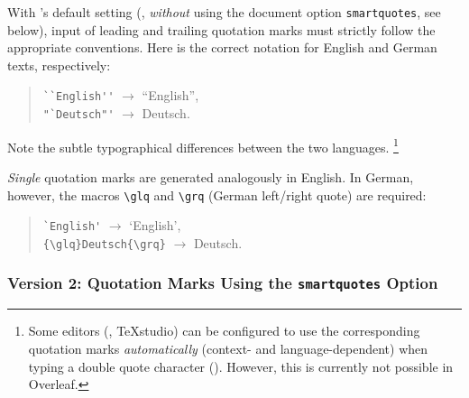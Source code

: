 With \latex's default setting (\ie, \emph{without} using the document option
\texttt{smartquotes}, see below), input of leading and trailing
quotation marks must strictly follow the appropriate conventions. Here is the
correct \latex notation for English and German texts, respectively:
%
\begin{quote}
    \verb!``English''! $\rightarrow$ ``English'',\\
    \verb!"`Deutsch"'! $\rightarrow$ {\glqq}Deutsch{\grqq}.
\end{quote}
%
Note the subtle typographical differences between the two languages.%
\footnote{Some editors (\eg, \textsf{TeXstudio}) can be configured to use the
corresponding quotation marks \emph{automatically} (context- and
language-dependent) when typing a double quote character
(\texttt{\textquotedbl}). However, this is currently not possible in
\textsf{Overleaf}.}

\emph{Single} quotation marks are generated analogously in English. In German,
however, the macros \verb!\glq! and \verb!\grq! (German left/right quote) are
required:
%
\begin{quote}
    \verb!`English'! $\rightarrow$ `English',\\
    \verb!{\glq}Deutsch{\grq}! $\rightarrow$ {\glq}Deutsch{\grq}.
\end{quote}

\subsubsection{Version 2: Quotation Marks Using the \texttt{smartquotes} Option}

